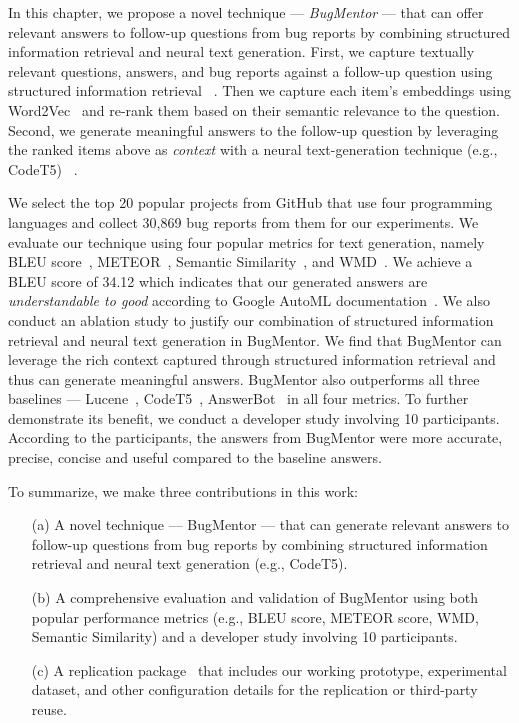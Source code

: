 In this chapter, we propose a novel technique --- \textit{BugMentor} --- that can offer relevant answers to follow-up questions from bug reports by combining structured information retrieval and neural text generation. First, we capture textually relevant questions, answers, and bug reports against a follow-up question using structured information retrieval ~\cite{saha2013improving}. Then we capture each item's embeddings using Word2Vec~\cite{efstathiou2018word} and re-rank them based on their semantic relevance to the question. Second, we generate meaningful answers to the follow-up question by leveraging the ranked items above as \textit{context} with a neural text-generation technique (e.g., CodeT5) ~\cite{yu2022code}.\par



We select the top 20 popular projects from GitHub that use four programming languages and collect 30,869 bug reports from them for our experiments. We evaluate our technique using four popular metrics for text generation, namely BLEU score~\cite{papineni2002bleu}, METEOR~\cite{banerjee2005meteor}, Semantic Similarity~\cite{haque2022semantic}, and WMD~\cite{huang2016supervised}. We achieve a BLEU score of 34.12 which indicates that our generated answers are \textit{understandable to good} according to Google AutoML documentation~\cite{automldoc}. We also conduct an ablation study to justify our combination of structured information retrieval and neural text generation in BugMentor. We find that BugMentor can leverage the rich context captured through structured information retrieval and thus can generate meaningful answers. BugMentor also outperforms all three baselines --- Lucene~\cite{mccandless2010lucene}, CodeT5~\cite{wang2021codet5}, AnswerBot~\cite{xu2017answerbot} in all four metrics.  To further demonstrate its benefit, we conduct a developer study involving 10 participants. According to the participants, the answers from BugMentor were more accurate, precise, concise and useful compared to the baseline answers.\par



To summarize, we make three contributions in this work:
\begin{itemize}
\item[(a)] A novel technique --- BugMentor --- that can generate relevant answers to follow-up questions from bug reports by combining structured information retrieval and neural text generation (e.g., CodeT5).
\item[(b)] A comprehensive evaluation and validation of BugMentor using both popular performance metrics (e.g., BLEU score, METEOR score, WMD, Semantic Similarity) and a developer study involving 10 participants.
\item[(c)] A replication package~\cite{bugmentorreplicationpackage} that includes our working prototype, experimental dataset, and other configuration details for the replication or third-party reuse.
\end{itemize}



